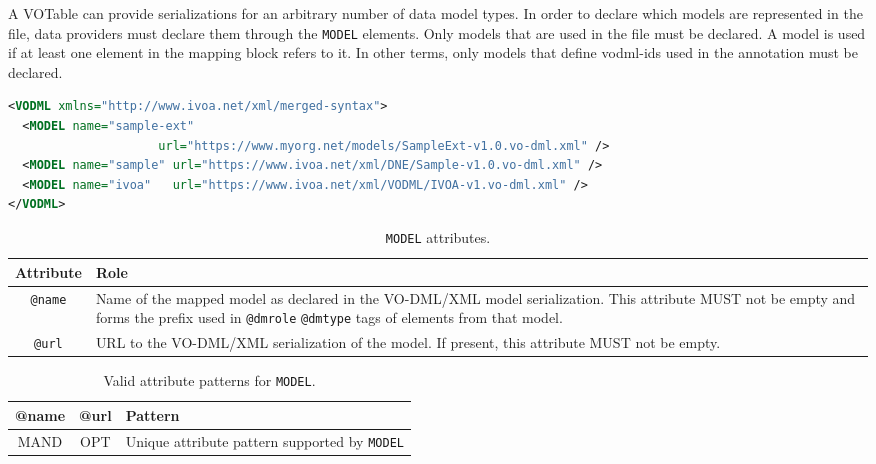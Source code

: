 A VOTable can provide serializations for an arbitrary number of data model
types. In order to declare which models are represented in the file, data
providers must declare them through the \texttt{MODEL} elements.
Only models that are used in the file must be declared. A model is
used if at least one element in the mapping block refers to it. In other terms, only models that define vodml-ids used in the
annotation must be declared.

\begin{lstlisting}[caption={Example \texttt{MODEL} mapping block.},language=XML]
<VODML xmlns="http://www.ivoa.net/xml/merged-syntax">
  <MODEL name="sample-ext"
                     url="https://www.myorg.net/models/SampleExt-v1.0.vo-dml.xml" />
  <MODEL name="sample" url="https://www.ivoa.net/xml/DNE/Sample-v1.0.vo-dml.xml" />
  <MODEL name="ivoa"   url="https://www.ivoa.net/xml/VODML/IVOA-v1.vo-dml.xml" />
</VODML>
\end{lstlisting}

\begin{table}[!htbp]
  \small
  \centering
  \begin{tabulary}{\linewidth}{|c|J|}       
    \hline 
         \textbf{Attribute} & 
         \textbf {Role}\\
    \hline
    \hline  
         \texttt{@name}  & 
         Name of the mapped model as declared in the VO-DML/XML model serialization.  This attribute MUST not be empty and forms the prefix used in  \texttt{@dmrole}  \texttt{@dmtype} tags of elements from that model.  \\
    \hline 
         \texttt{@url} & 
         URL to the VO-DML/XML serialization of the model. If present, this attribute MUST not be empty.\\
    \hline 
  \end{tabulary}
  \caption{\texttt{MODEL} attributes.} 
  \label{tbl:model-att}
\end{table}


\begin{table}[!htbp]
  \small
  \centering
  \begin{tabulary}{\linewidth}{|c |c |J|}
    \hline 
        \textbf{@name} &
        \textbf{@url} &
        \textbf{Pattern}\\
    \hline      \hline  
        MAND &           
        OPT &           
        Unique attribute pattern supported by \texttt{MODEL}\\
    \hline 
  \end{tabulary}
  \caption{Valid attribute patterns for  \texttt{MODEL}.} 
  \label{tbl:model-pattern}
\end{table}
